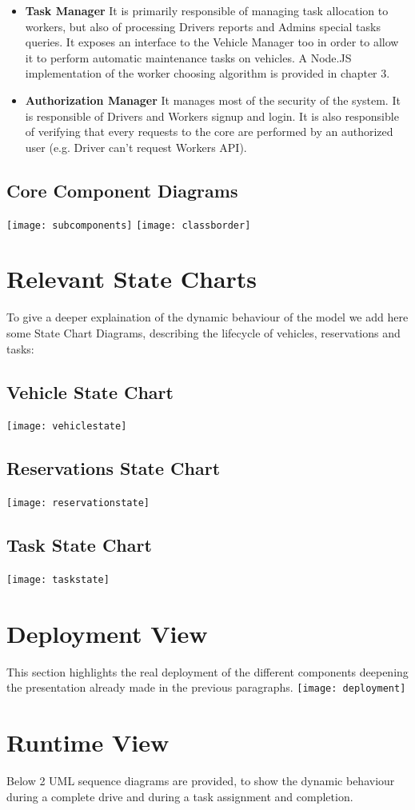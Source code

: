 \begin{itemize}
\item \textbf{Task Manager} It is primarily responsible of managing task allocation to workers, but also of processing Drivers reports and Admins special tasks queries. It exposes an interface to the Vehicle Manager too in order to allow it to perform automatic maintenance tasks on vehicles. A Node.JS implementation of the worker choosing algorithm is provided in chapter 3.
\item \textbf{Authorization Manager} It manages most of the security of the system. It is responsible of Drivers and Workers signup and login. It is also responsible of verifying that every requests to the core are performed by an authorized user (e.g. Driver can't request Workers API). 
\end{itemize}

\subsection{Core Component Diagrams}
\texttt{[image: subcomponents]}
\texttt{[image: classborder]}
\newpage
\section{Relevant State Charts}
To give a deeper explaination of the dynamic behaviour of the model we add here some State Chart Diagrams, describing the lifecycle of vehicles, reservations and tasks:
\subsection{Vehicle State Chart}
\texttt{[image: vehiclestate]}
\subsection{Reservations State Chart}
\texttt{[image: reservationstate]}
\subsection{Task State Chart}
\texttt{[image: taskstate]}
\newpage
\section{Deployment View}
This section highlights the real deployment of the different components deepening the presentation already made in the previous paragraphs.
\texttt{[image: deployment]}
\newpage
\section{Runtime View}
Below 2 UML sequence diagrams are provided, to show the dynamic behaviour during a complete drive and during a task assignment and completion.
